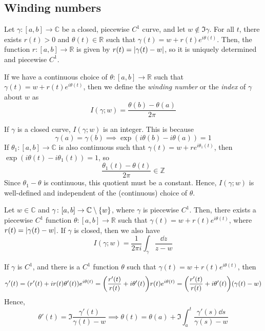 \subsection{Winding numbers}
Let \( \gamma \colon [a,b] \to \mathbb C \) be a closed, piecewise \( C^1 \) curve, and let \( w \not\in \Im \gamma \).
For all \( t \), there exists \( r(t) > 0 \) and \( \theta(t) \in \mathbb R \) such that \( \gamma(t) = w + r(t) e^{i\theta(t)} \).
Then, the function \( r \colon [a,b] \to \mathbb R \) is given by \( r(t) = \abs{\gamma(t) - w} \), so it is uniquely determined and piecewise \( C^1 \).
\begin{definition}
	If we have a continuous choice of \( \theta \colon [a,b] \to \mathbb R \) such that \( \gamma(t) = w + r(t) e^{i\theta(t)} \), then we define the \textit{winding number} or the \textit{index} of \( \gamma \) about \( w \) as
	\[
		I(\gamma; w) = \frac{\theta(b) - \theta(a)}{2\pi}
	\]
\end{definition}
If \( \gamma \) is a closed curve, \( I(\gamma;w) \) is an integer.
This is because
\[ \gamma(a) = \gamma(b) \implies \exp(i\theta(b) - i\theta(a)) = 1 \]
If \( \theta_1 \colon [a,b] \to \mathbb C \) is also continuous such that \( \gamma(t) = w + re^{i\theta_1(t)} \), then \( \exp(i\theta(t) - i\theta_1(t)) = 1 \), so
\[ \frac{\theta_1(t) - \theta(t)}{2\pi} \in \mathbb Z \]
Since \( \theta_1 - \theta \) is continuous, this quotient must be a constant.
Hence, \( I(\gamma;w) \) is well-defined and independent of the (continuous) choice of \( \theta \).
\begin{lemma}
	Let \( w \in \mathbb C \) and \( \gamma \colon [a,b] \to \mathbb C \setminus \qty{w} \), where \( \gamma \) is piecewise \( C^1 \).
	Then, there exists a piecewise \( C^1 \) function \( \theta \colon [a,b] \to \mathbb R \) such that \( \gamma(t) = w + r(t) e^{i\theta(t)} \), where \( r(t) = \abs{\gamma(t) - w} \).
	If \( \gamma \) is closed, then we also have
	\[
		I(\gamma; w) = \frac{1}{2\pi i} \int_\gamma \frac{\dd{z}}{z-w}
	\]
\end{lemma}
\begin{remark}
	If \( \gamma \) is \( C^1 \), and there is a \( C^1 \) function \( \theta \) such that \( \gamma(t) = w + r(t) e^{i\theta(t)} \), then
	\[
		\gamma'(t) = (r'(t) + ir(t) \theta'(t))e^{i\theta(t)} = \qty(\frac{r'(t)}{r(t)} + i\theta'(t)) r(t) e^{i\theta(t)} = \qty(\frac{r'(t)}{r(t)} + i\theta'(t))(\gamma(t) - w)
	\]
	Hence,
	\[
		\theta'(t) = \Im \frac{\gamma'(t)}{\gamma(t) - w} \implies \theta(t) = \theta(a) + \Im \int_a^t \frac{\gamma'(s) \dd{s}}{\gamma(s) - w}
	\]
\end{remark}

